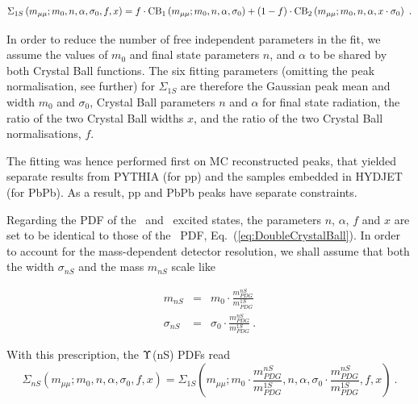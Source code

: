 \begin{equation}
\Sigma_{1S}\left( m_{\mu\mu} ; m_{0}, n, \alpha, \sigma_{0}, f, x\right) = f\cdot {\rm CB}_{1}\left( m_{\mu\mu}
  ; m_{0}, n, \alpha, \sigma_{0} \right) + \left(1-f\right)\cdot
{\rm CB}_{2}\left(  m_{\mu\mu};m_{0},n,\alpha,x\cdot\sigma_{0}\right) \ .
\label{eq:DoubleCrystalBall}
\end{equation}


In order to reduce the number of free independent parameters in the
fit, we assume the values of $m_0$ and final state parameters $n$, and
$\alpha$ to be shared by both Crystal Ball functions. 
The six fitting parameters (omitting the peak normalisation, see
further) for $\Sigma_{1S}$ are therefore the Gaussian peak mean and
width $m_0$ and $\sigma_{0}$,
Crystal Ball parameters $n$ and $\alpha$ for final state radiation,
the ratio of the two Crystal Ball widths $x$, and the ratio of the two
Crystal Ball normalisations, $f$.

The fitting was hence performed first on MC reconstructed
peaks, that yielded
 separate results from PYTHIA (for pp) and the samples embedded in
 HYDJET (for PbPb). As a result, pp and PbPb peaks have separate constraints.

Regarding the PDF of the \PgUb\ and \PgUc\ excited states, the
parameters $n$, $\alpha$, $f$ and $x$ are set to be identical to those
of the \PgUa\ PDF, Eq.~(\ref{eq:DoubleCrystalBall}). In order to account for the
mass-dependent detector resolution, we shall assume that both the
width $\sigma_{nS}$ and the mass $m_{nS}$ scale like 

%
  \begin{eqnarray}
    m_{nS} & = & m_{0} \cdot \frac{m^{nS}_{PDG} }{m^{1S}_{PDG}}  \\
    \sigma_{nS} & = & \sigma_{0} \cdot  \frac{m^{nS}_{PDG}
    }{m^{1S}_{PDG}}  \nonumber \ .
    \label{eq:massRatio}
  \end{eqnarray}
%

With this prescription, the $\Upsilon$(nS) PDFs read
\begin{equation}
\Sigma_{nS}\left( m_{\mu\mu} ; m_{0}, n, \alpha, \sigma_{0}, f, x\right) =
\Sigma_{1S}\left( m_{\mu\mu}
  ; m_{0} \cdot \frac{m^{nS}_{PDG} }{m^{1S}_{PDG}}, n, \alpha, \sigma_{0} \cdot  \frac{m^{nS}_{PDG} }{m^{1S}_{PDG}}, f, x \right) \ .
  \end{equation}

